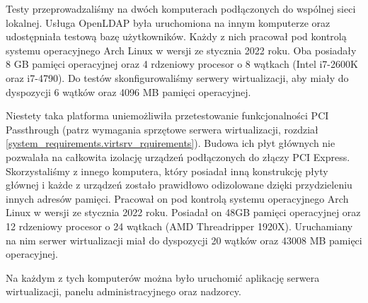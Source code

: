 \documentclass[../analiza-rozwiazania.tex]{subfiles}
\begin{document}
Testy przeprowadzaliśmy na dwóch komputerach podłączonych do wspólnej sieci lokalnej.
Usługa OpenLDAP była uruchomiona na innym komputerze oraz udostępniała testową bazę użytkowników.
Każdy z nich pracował pod kontrolą systemu operacyjnego Arch Linux w wersji ze stycznia 2022 roku.
Oba posiadały 8 GB pamięci operacyjnej oraz 4 rdzeniowy procesor o 8 wątkach (Intel i7-2600K oraz i7-4790).
Do testów skonfigurowaliśmy serwery wirtualizacji, aby miały do dyspozycji 6 wątków oraz 4096 MB pamięci operacyjnej.

Niestety taka platforma uniemożliwiła przetestowanie funkcjonalności PCI Passthrough (patrz wymagania sprzętowe serwera wirtualizacji, rozdział \ref{system_requirements.virtsrv_rquirements}).
Budowa ich płyt głównych nie pozwalała na całkowita izolację urządzeń podłączonych do złączy PCI Express.
Skorzystaliśmy z innego komputera, który posiadał inną konstrukcję płyty głównej i każde z urządzeń zostało prawidłowo odizolowane dzięki przydzieleniu innych adresów pamięci.
Pracował on pod kontrolą systemu operacyjnego Arch Linux w wersji ze stycznia 2022 roku.
Posiadał on 48GB pamięci operacyjnej oraz 12 rdzeniowy procesor o 24 wątkach (AMD Threadripper 1920X).
Uruchamiany na nim serwer wirtualizacji miał do dyspozycji 20 wątków oraz 43008 MB pamięci operacyjnej.

Na każdym z tych komputerów można było uruchomić aplikację serwera wirtualizacji, panelu administracyjnego oraz nadzorcy.
\end{document}

